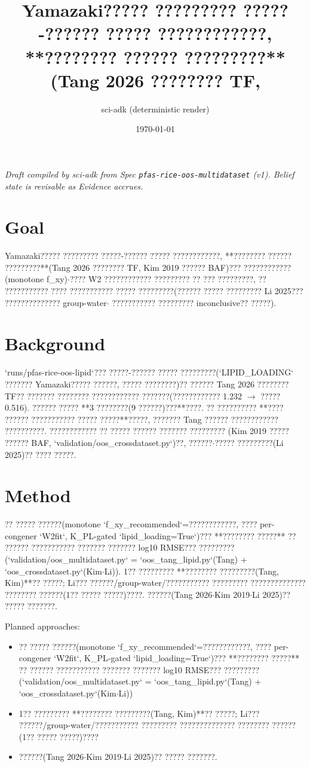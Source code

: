 \documentclass{article}
\title{Yamazaki????? ????????? ?????-?????? ????? ????????????, **???????? ?????? ?????????**(Tang 2026 ???????? TF,}
\author{sci-adk (deterministic render)}
\date{\today}
\begin{document}
\maketitle

\noindent\textit{Draft compiled by sci-adk from Spec \texttt{pfas-rice-oos-multidataset} (v1). Belief state is revisable as Evidence accrues.}

\section{Goal}
Yamazaki????? ????????? ?????-?????? ????? ????????????, **???????? ?????? ?????????**(Tang 2026 ???????? TF,
Kim 2019 ?????? BAF)??? ????????????(monotone f\_xy)$\cdot$???? W2 ???????????? ????????? ?? ??? ?????????,
?? ??????????? ???? ??????????? ????? ?????????(?????? ????? ????????? Li 2025??? ?????????????? group-water$\cdot$
??????????? ????????? inconclusive?? ?????).

\section{Background}
`runs/pfas-rice-oos-lipid`??? ?????-?????? ????? ?????????(`LIPID\_LOADING` ??????? Yamazaki????? ??????,
????? ????????)?? ?????? Tang 2026 ???????? TF?? ??????? ???????? ???????????? ???????(???????????? 1.232 $\rightarrow$
????? 0.516). ?????? ????? **3 ????????(9 ??????)???**????. ?? ?????????? **???? ?????? ??????????? ?????
?????**?????, ??????? Tang ?????? ???????????? ??????????. ???????????? ?? ????? ?????? ??????? ?????????
(Kim 2019 ????? ?????? BAF, `validation/oos\_crossdataset.py`)??, ??????$\cdot$????? ?????????(Li 2025)??
???? ?????.

\section{Method}
?? ????? ??????(monotone `f\_xy\_recommended`=????????????, ???? per-congener `W2fit`, K\_PL-gated
`lipid\_loading=True`)??? **???????? ?????** ?? ?????? ??????????? ??????? ??????? log10 RMSE??? ?????????
(`validation/oos\_multidataset.py` = `oos\_tang\_lipid.py`(Tang) + `oos\_crossdataset.py`(Kim$\cdot$Li)).
1?? ????????? **???????? ?????????(Tang, Kim)**?? ?????; Li??? ??????/group-water/??????????? ?????????
?????????????? ???????? ??????(1?? ????? ?????)????. ??????(Tang 2026$\cdot$Kim 2019$\cdot$Li 2025)?? ????? ???????.

Planned approaches:
\begin{itemize}
  \item ?? ????? ??????(monotone `f\_xy\_recommended`=????????????, ???? per-congener `W2fit`, K\_PL-gated
`lipid\_loading=True`)??? **???????? ?????** ?? ?????? ??????????? ??????? ??????? log10 RMSE??? ?????????
(`validation/oos\_multidataset.py` = `oos\_tang\_lipid.py`(Tang) + `oos\_crossdataset.py`(Kim$\cdot$Li))
  \item 1?? ????????? **???????? ?????????(Tang, Kim)**?? ?????; Li??? ??????/group-water/??????????? ?????????
?????????????? ???????? ??????(1?? ????? ?????)????
  \item ??????(Tang 2026$\cdot$Kim 2019$\cdot$Li 2025)?? ????? ???????.
\end{itemize}
\end{document}

